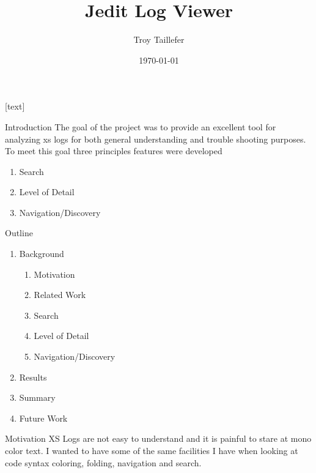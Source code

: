 \documentclass{beamer}
\title{Jedit Log Viewer}
\author{Troy Taillefer}
\institute{Broadsoft}
\date{\today}
\begin{document}
[text]

\frame{\titlepage}

\begin{frame}{Introduction}
The goal of the project was to provide an excellent tool for analyzing xs logs 
for both general understanding and trouble shooting purposes. To meet this goal three
principles features were developed

\begin{enumerate}
\item Search
\item Level of Detail
\item Navigation/Discovery
\end{enumerate}
\end{frame}

\begin{frame}{Outline}
\begin{enumerate}
\item Background
\begin{enumerate}
\item Motivation
\item Related Work
\item Search
\item Level of Detail
\item Navigation/Discovery
\end{enumerate}
\item Results
\item Summary
\item Future Work
\end{enumerate}
\end{frame}


\begin{frame}{Motivation}
XS Logs are not easy to understand and 
it is painful to stare at mono color text. I wanted to have some of the same facilities
I have when looking at code syntax coloring, folding, navigation and search. 
\end{frame}
\end{document}

